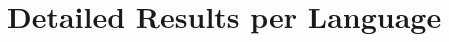 \documentclass[11pt,letterpaper]{article}
\begin{document}
\section{Detailed Results per Language}

%
%
%
%
%
%
%
%
%


%
%
%
%
%
%
%
%
\end{document}

